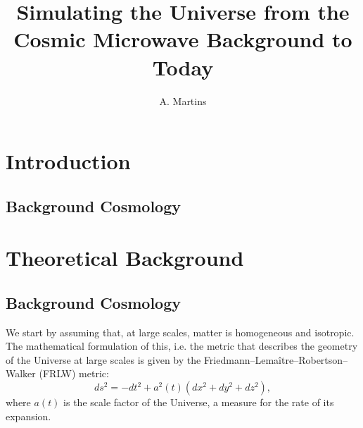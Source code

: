 \documentclass{aa}
\begin{document}
 


   \title{Simulating the Universe from the Cosmic Microwave Background to Today}

   \subtitle{}

   \author{A. Martins
          }


   \date{}

 
  \abstract
   {}
   {}
   {}
   {}
   {}

   \keywords{
               }

   \maketitle
%

\section{Introduction}

\subsection{Background Cosmology}

\section{Theoretical Background}

\subsection{Background Cosmology}

We start by assuming that, at large scales, matter is homogeneous and isotropic. The mathematical formulation of this, i.e. the metric that describes the geometry of the Universe at large scales is given by the Friedmann–Lemaître–Robertson–Walker (FRLW) metric:
\begin{equation}
ds^2 = -dt^2 + a^2(t)(dx^2 + dy^2 + dz^2),
\end{equation}
where $a(t)$ is the scale factor of the Universe, a measure for the rate of its expansion.
\end{document}
